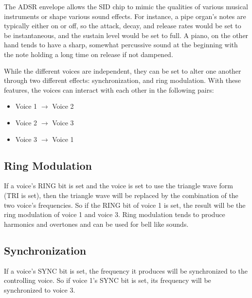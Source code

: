 The ADSR envelope allows the SID chip to mimic the qualities of various musical instruments or shape various sound effects. For instance, a pipe organ's notes are typically either on or off, so the attack, decay, and release rates would be set to be instantaneous, and the sustain level would be set to full. A piano, on the other hand tends to have a sharp, somewhat percussive sound at the beginning with the note holding a long time on release if not dampened.

While the different voices are independent, they can be set to alter one another through two different effects: synchronization, and ring modulation. With these features, the voices can interact with each other in the following pairs:

\begin{itemize}
\item Voice 1 $\rightarrow$ Voice 2
\item Voice 2 $\rightarrow$ Voice 3
\item Voice 3 $\rightarrow$ Voice 1
\end{itemize}

\subsection{Ring Modulation}

If a voice's RING bit is set and the voice is set to use the triangle wave form (TRI is set), then the triangle wave will be replaced by the combination of the two voice's frequencies. So if the RING bit of voice 1 is set, the result will be the ring modulation of voice 1 and voice 3. Ring modulation tends to produce harmonics and overtones and can be used for bell like sounds.

\subsection{Synchronization}

If a voice's SYNC bit is set, the frequency it produces will be synchronized to the controlling voice. So if voice 1's SYNC bit is set, its frequency will be synchronized to voice 3.

